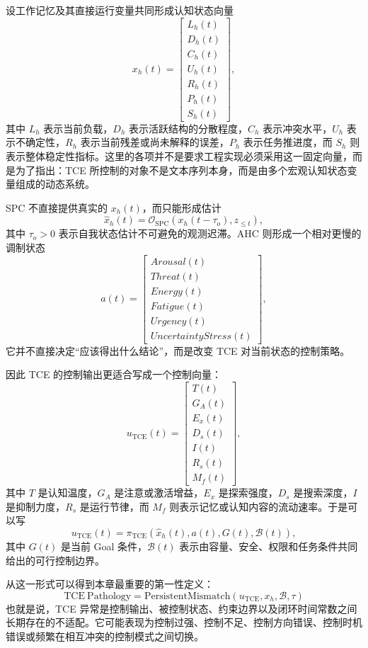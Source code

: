 设工作记忆及其直接运行变量共同形成认知状态向量
\[
x_h(t)
=
\begin{bmatrix}
L_h(t)\\
D_h(t)\\
C_h(t)\\
U_h(t)\\
R_h(t)\\
P_h(t)\\
S_h(t)
\end{bmatrix},
\]
其中 \(L_h\) 表示当前负载，\(D_h\) 表示活跃结构的分散程度，\(C_h\) 表示冲突水平，\(U_h\) 表示不确定性，\(R_h\) 表示当前残差或尚未解释的误差，\(P_h\) 表示任务推进度，而 \(S_h\) 则表示整体稳定性指标。这里的各项并不是要求工程实现必须采用这一固定向量，而是为了指出：TCE 所控制的对象不是文本序列本身，而是由多个宏观认知状态变量组成的动态系统。

SPC 不直接提供真实的 \(x_h(t)\)，而只能形成估计
\[
\hat{x}_h(t)
=
\mathcal O_{\mathrm{SPC}}
\left(
x_h(t-\tau_o),
z_{\leq t}
\right),
\]
其中 \(\tau_o>0\) 表示自我状态估计不可避免的观测迟滞。AHC 则形成一个相对更慢的调制状态
\[
a(t)
=
\begin{bmatrix}
Arousal(t)\\
Threat(t)\\
Energy(t)\\
Fatigue(t)\\
Urgency(t)\\
UncertaintyStress(t)
\end{bmatrix},
\]
它并不直接决定“应该得出什么结论”，而是改变 TCE 对当前状态的控制策略。

因此 TCE 的控制输出更适合写成一个控制向量：
\[
u_{\mathrm{TCE}}(t)
=
\begin{bmatrix}
T(t)\\
G_A(t)\\
E_x(t)\\
D_s(t)\\
I(t)\\
R_s(t)\\
M_f(t)
\end{bmatrix},
\]
其中 \(T\) 是认知温度，\(G_A\) 是注意或激活增益，\(E_x\) 是探索强度，\(D_s\) 是搜索深度，\(I\) 是抑制力度，\(R_s\) 是运行节律，而 \(M_f\) 则表示记忆或认知内容的流动速率。于是可以写
\[
u_{\mathrm{TCE}}(t)
=
\pi_{\mathrm{TCE}}
\left(
\hat{x}_h(t),
a(t),
G(t),
\mathcal B(t)
\right),
\]
其中 \(G(t)\) 是当前 Goal 条件，\(\mathcal B(t)\) 表示由容量、安全、权限和任务条件共同给出的可行控制边界。

从这一形式可以得到本章最重要的第一性定义：
\[
\boxed{
\mathrm{TCE\ Pathology}
=
\mathrm{PersistentMismatch}
\left(
u_{\mathrm{TCE}},
x_h,
\mathcal B,
\tau
\right)
}
\]
也就是说，TCE 异常是控制输出、被控制状态、约束边界以及闭环时间常数之间长期存在的不适配。它可能表现为控制过强、控制不足、控制方向错误、控制时机错误或频繁在相互冲突的控制模式之间切换。

